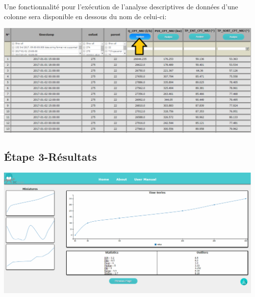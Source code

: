 		Une fonctionnalité pour l'exécution de l'analyse descriptives de données d'une colonne sera disponible en dessous du nom de celui-ci:   \\
		
		\begin{center}\includegraphics[scale=0.45]{fenetre2Analyse.png}\end{center}
		
		
	\subsection{Étape 3-Résultats}
			\begin{center}\includegraphics[scale=0.45]{fenetre3.png}\end{center}
			
